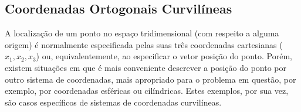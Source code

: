 \subsection {Coordenadas Ortogonais Curvil\'ineas}

A localiza\c{c}\~ao de um ponto no espa\c{c}o tridimensional
(com respeito a alguma origem) \'e normalmente especificada pelas
suas tr\^es coordenadas cartesianas ($x_1, x_2, x_3$) ou,
equivalentemente, ao especificar o vetor posi\c{c}\~ao do ponto.
Por\'em, existem situa\c{c}\~oes em que \'e mais conveniente
descrever a posi\c{c}\~ao do ponto por outro sistema
de coordenadas, mais apropriado para o problema em quest\~ao,
por exemplo, por coordenadas esf\'ericas ou cil\'indricas. Estes
exemplos, por sua vez, s\~ao casos espec\'ificos de sistemas
de coordenadas curvil\'ineas.

